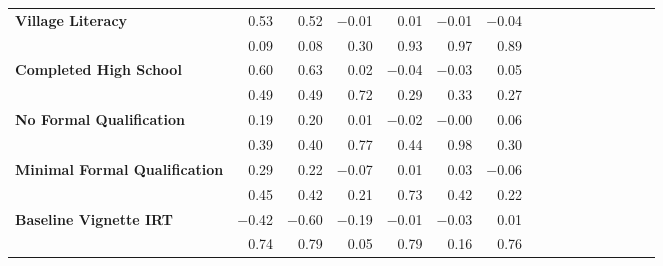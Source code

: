 \begin{tabular}{@{\extracolsep{5pt}}lrrrrrrrrrrrrrrr}
{\bf Village Literacy} & 0.53\phantom{***} & 0.52\phantom{***} & $-$0.01\phantom{***} & 0.01\phantom{***} & $-$0.01\phantom{***} & $-$0.04\phantom{***} \\
{\bf } & 0.09\phantom{***} & 0.08\phantom{***} & 0.30\phantom{***} & 0.93\phantom{***} & 0.97\phantom{***} & 0.89\phantom{***} \\
{\bf Completed High School} & 0.60\phantom{***} & 0.63\phantom{***} & 0.02\phantom{***} & $-$0.04\phantom{***} & $-$0.03\phantom{***} & 0.05\phantom{***} \\
{\bf } & 0.49\phantom{***} & 0.49\phantom{***} & 0.72\phantom{***} & 0.29\phantom{***} & 0.33\phantom{***} & 0.27\phantom{***} \\
{\bf No Formal Qualification} & 0.19\phantom{***} & 0.20\phantom{***} & 0.01\phantom{***} & $-$0.02\phantom{***} & $-$0.00\phantom{***} & 0.06\phantom{***} \\
{\bf } & 0.39\phantom{***} & 0.40\phantom{***} & 0.77\phantom{***} & 0.44\phantom{***} & 0.98\phantom{***} & 0.30\phantom{***} \\
{\bf Minimal Formal Qualification} & 0.29\phantom{***} & 0.22\phantom{***} & $-$0.07\phantom{***} & 0.01\phantom{***} & 0.03\phantom{***} & $-$0.06\phantom{***} \\
{\bf } & 0.45\phantom{***} & 0.42\phantom{***} & 0.21\phantom{***} & 0.73\phantom{***} & 0.42\phantom{***} & 0.22\phantom{***} \\
{\bf Baseline Vignette IRT} & $-$0.42\phantom{***} & $-$0.60\phantom{***} & $-$0.19\phantom{***} & $-$0.01\phantom{***} & $-$0.03\phantom{***} & 0.01\phantom{***} \\
{\bf } & 0.74\phantom{***} & 0.79\phantom{***} & 0.05\phantom{***} & 0.79\phantom{***} & 0.16\phantom{***} & 0.76\phantom{***} \\
\hline
\end{tabular}
